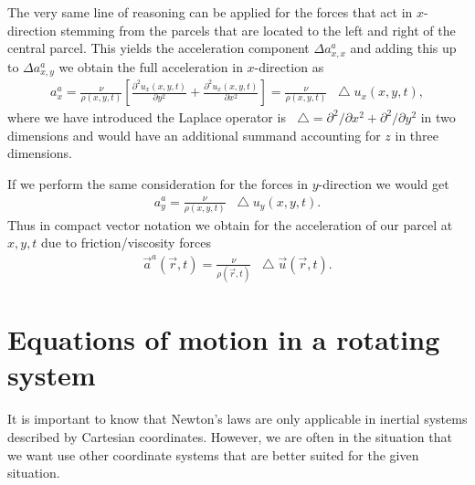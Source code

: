 \documentclass[10pt,a4paper]{article}
\newcommand*\Laplace{\mathop{}\!\mathbin\bigtriangleup}
\begin{document}
The very same line of reasoning can be applied for the forces that act in $x$-direction stemming from the parcels that are located to the left and right of the central parcel.
%
This yields the acceleration component $\Delta a^a_{x, x} $ and adding this up to $\Delta a^a_{x, y}$ we obtain the full acceleration in $x$-direction as 
%
\begin{align}
a^a_{x}  = \frac{\nu}{\rho(x,y,t)} \left[ \frac{\partial^2 u_x(x, y, t)}{\partial y^2} + \frac{\partial^2 u_x(x, y, t)}{\partial x^2} \right] = \frac{\nu}{\rho(x,y,t)} \Laplace u_x(x, y, t) ,
\end{align}
%
where we have introduced the Laplace operator is $\Laplace = \partial^2/\partial x^2 + \partial^2/\partial y^2$ in two dimensions and would have an additional summand accounting for $z$ in three dimensions.

If we perform the same consideration for the forces in $y$-direction we would get 
%
\begin{align}
a^a_{y}  = \frac{\nu}{\rho(x,y,t)} \Laplace u_y(x, y, t) .
\end{align}
%
Thus in compact vector notation we obtain for the acceleration of our parcel at $x,y,t$ due to friction/viscosity forces
%
\begin{align}
\boxed{ \vec{a}^a(\vec{r},t)  = \frac{\nu}{\rho(\vec{r},t)} \Laplace \vec{u}(\vec{r}, t)} .
\end{align}
%

\section{Equations of motion in a rotating system}

It is important to know that Newton's laws are only applicable in inertial systems described by Cartesian coordinates.
%
However, we are often in the situation that we want use other coordinate systems that are better suited for the given situation.
\end{document}
